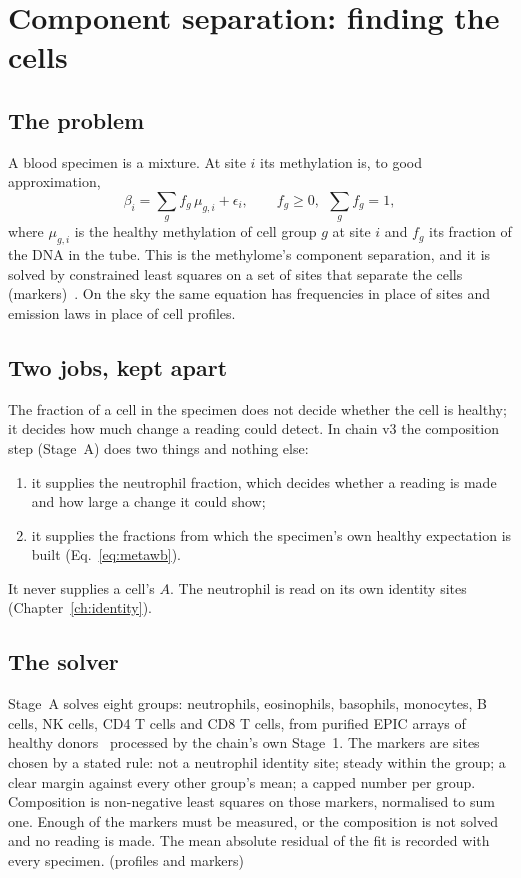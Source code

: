 \chapter{Component separation: finding the cells}\label{ch:separation}

\section{The problem}

A blood specimen is a mixture. At site $i$ its methylation is, to good approximation,
\begin{equation}
  \beta_i=\sum_g f_g\,\mu_{g,i}+\epsilon_i,\qquad f_g\ge0,\ \ \sum_g f_g=1,
  \label{eq:mix}
\end{equation}
where $\mu_{g,i}$ is the healthy methylation of cell group $g$ at site $i$ and $f_g$ its fraction of the DNA in the tube. This is the
methylome's component separation, and it is solved by constrained least squares on a set of sites that separate the cells
(markers)~\cite{Houseman2012,Salas2022}. On the sky the same equation has frequencies in place of sites and emission laws in place
of cell profiles.

\section{Two jobs, kept apart}

The fraction of a cell in the specimen does not decide whether the cell is healthy; it decides how much change a reading could detect. In chain v3 the composition
step (Stage~A) does two things and nothing else:
\begin{enumerate}
\item it supplies the neutrophil fraction, which decides whether a reading is made and how large a change it could show;
\item it supplies the fractions from which the specimen's own healthy expectation is built (Eq.~\eqref{eq:metawb}).
\end{enumerate}
It never supplies a cell's $A$. The neutrophil is read on its own identity sites (Chapter~\ref{ch:identity}).

\section{The solver}

Stage~A solves eight groups: neutrophils, eosinophils, basophils, monocytes, B cells, NK cells, CD4 T cells and CD8 T cells, from purified
EPIC arrays of healthy donors~\cite{Salas2018,Salas2022} processed by the chain's own Stage~1.
The markers are sites chosen by a stated rule: not a neutrophil identity site; steady within the group; a clear margin
against every other group's mean; a capped number per group. Composition is non-negative least squares on those markers, normalised to sum one.
Enough of the markers must be measured, or the composition is not solved and no reading is made. The mean absolute residual
of the fit is recorded with every specimen. \calibrated{} (profiles and markers)

